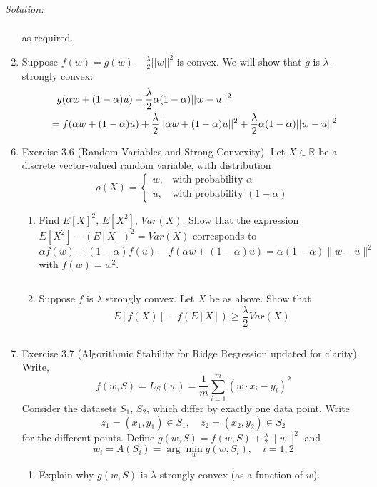 \documentclass[
10pt, %
a4paper, %
oneside, %
headinclude,footinclude, %
BCOR5mm, %
]{scrartcl}
\newenvironment{solution}
               {\textit{Solution:}}
               {}
\begin{document}
\begin{solution}
\begin{enumerate}[label=(\alph*)]
\begin{align*}
      \end{align*}
        as required.
      \item Suppose $f(w) = g(w) - \frac{\lambda}{2}||w||^2$ is convex. We will show that $g$ is $\lambda$-strongly convex:
        \begin{align*}
          &\hphantom{=} g(\alpha w + (1-\alpha)u) + \frac{\lambda}{2}\alpha(1-\alpha)||w-u||^2 \\
          &= f(\alpha w + (1-\alpha)u) + \frac{\lambda}{2}||\alpha w + (1-\alpha) u||^2 + \frac{\lambda}{2}\alpha(1-\alpha)||w-u||^2
        \end{align*}
  \end{enumerate}
\end{solution}

\begin{enumerate}
\setcounter{enumi}{5}
    \item Exercise 3.6 (Random Variables and Strong Convexity). Let $X \in \mathbb{R}$ be a discrete vector-valued random variable, with distribution
    \[
    \rho(X) =
    \begin{cases}
      w, & \text{with probability }\alpha \\
      u, & \text{with probability }(1 - \alpha)
    \end{cases}
    \]
    \begin{enumerate}
        \item Find $E[X]^2$, $E[X^2]$, $Var(X)$. Show that the expression $E[X^2] - (E[X])^2 = Var(X)$ corresponds to
        \[
        \alpha f(w) + (1 - \alpha) f(u) - f(\alpha w + (1 - \alpha) u) = \alpha (1 - \alpha) \|w - u\|^2
        \]
        with $f(w) = w^2$.

        \[\] %

        \item Suppose $f$ is $\lambda$ strongly convex. Let $X$ be as above. Show that
        \[
        E[f(X)] - f(E[X]) \geq \frac{\lambda}{2} Var(X)
        \]

        \[\] %
    \end{enumerate}

    \item Exercise 3.7 (Algorithmic Stability for Ridge Regression updated for clarity). Write,
    \[
    f(w, S) = L_S(w) = \frac{1}{m} \sum_{i=1}^{m} (w \cdot x_i - y_i)^2
    \]
    Consider the datasets $S_1$, $S_2$, which differ by exactly one data point. Write
    \[
    z_1 = (x_1, y_1) \in S_1, \quad z_2 = (x_2, y_2) \in S_2
    \]
    for the different points. Define $g(w, S) = f(w, S) + \frac{\lambda}{2} \|w\|^2$ and
    \[
    w_i = A(S_i) = \arg\min_w g(w, S_i), \quad i = 1, 2
    \]
    \begin{enumerate}
        \item Explain why $g(w, S)$ is $\lambda$-strongly convex (as a function of $w$).


\end{enumerate}
\end{enumerate}
\end{document}
